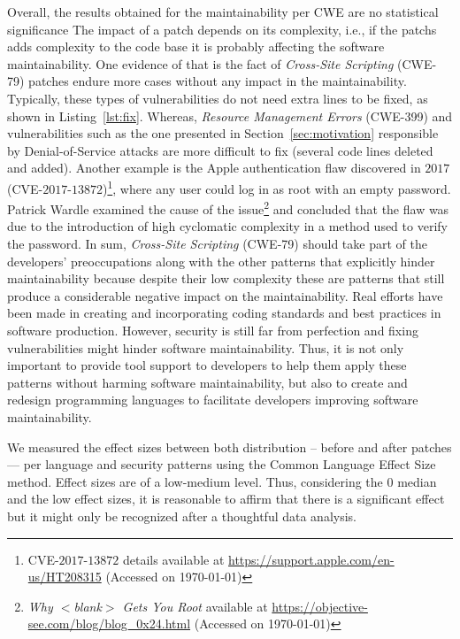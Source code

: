 \documentclass[10pt,conference]{IEEEtran}
\begin{document}
Overall, the results obtained for the maintainability per CWE are no statistical significance 
The impact of a patch depends on its complexity, i.e., if the patchs
adds complexity to the code base it is probably affecting the software
maintainability. One evidence of that is the fact of \emph{Cross-Site Scripting} (CWE-79)
patches endure more
cases without any impact in the maintainability. Typically, these types of
vulnerabilities do not need extra lines to be fixed, as shown in
Listing~\ref{lst:fix}. Whereas, \emph{Resource Management Errors} (CWE-399) and vulnerabilities
such as the one presented in Section~\ref{sec:motivation} responsible by Denial-of-Service
attacks are more difficult to fix (several code lines deleted and added).
Another example is the Apple authentication flaw discovered in $2017$
(CVE-$2017$-$13872$)\footnote{CVE-$2017$-$13872$ details available at
\url{https://support.apple.com/en-us/HT208315} (Accessed on \today{})}, where any user
could log in as root with an empty password. Patrick Wardle examined the cause
of the issue\footnote{\emph{Why $<$blank$>$ Gets You Root} available at
\url{https://objective-see.com/blog/blog\_0x24.html} (Accessed on \today{})} and
concluded that the flaw was due to the introduction of high cyclomatic complexity
in a method used to verify the password. In sum, \emph{Cross-Site Scripting} (CWE-79) should take part of the
developers' preoccupations along with the other patterns that explicitly hinder
maintainability because despite their low complexity these are patterns that
still produce a considerable negative impact on the maintainability. Real
efforts have been made in creating and incorporating coding standards and best
practices in software production. However, security is still far from perfection
and fixing vulnerabilities might hinder software maintainability. Thus, it is
not only important to provide tool support to developers to help them apply these
patterns without harming software maintainability, but also to create and redesign
programming languages to facilitate developers improving software maintainability.

We measured the effect sizes between both distribution -- before and after
patches --- per language and security patterns using the Common Language Effect
Size~\cite{cliff:1993} method. Effect sizes are of a low-medium level.
Thus, considering the $0$ median and the low effect sizes, it is reasonable
to affirm that there is a significant effect but it might only be
recognized after a thoughtful data analysis.
\end{document}

